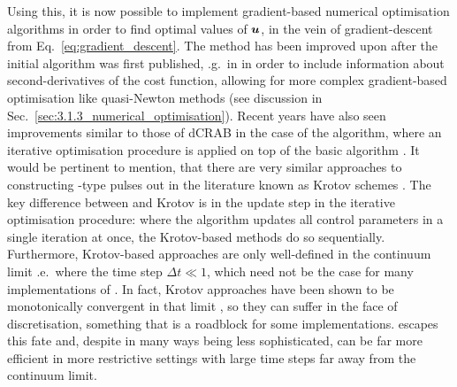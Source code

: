 Using this, it is now possible to implement gradient-based numerical optimisation algorithms in order to find optimal values of $\boldsymbol{u}$, in the vein of gradient-descent from Eq.~\ref{eq:gradient_descent}. The method has been improved upon after the initial algorithm was first published, \@e.g.~in \cite{machnes_comparing_2011} in order to include information about second-derivatives of the cost function, allowing for more complex gradient-based optimisation like quasi-Newton methods (see discussion in Sec.~\ref{sec:3.1.3_numerical_optimisation}). Recent years have also seen improvements similar to those of dCRAB in the case of the  algorithm, where an iterative optimisation procedure is applied on top of the basic  algorithm \cite{chen_iterative_2022}. It would be pertinent to mention, that there are very similar approaches to constructing -type pulses out in the literature known as Krotov schemes \cite{reich_monotonically_2012}. The key difference between  and Krotov is in the update step in the iterative optimisation procedure: where the  algorithm updates all control parameters in a single iteration at once, the Krotov-based methods do so sequentially. Furthermore, Krotov-based approaches are only well-defined in the continuum limit \@i.e.~where the time step $\Delta t \ll 1$, which need not be the case for many implementations of . In fact, Krotov approaches have been shown to be monotonically convergent in that limit \cite{morzhin_krotov_2019}, so they can suffer in the face of discretisation, something that is a roadblock for some implementations.  escapes this fate and, despite in many ways being less sophisticated, can be far more efficient in more restrictive settings with large time steps far away from the continuum limit.

